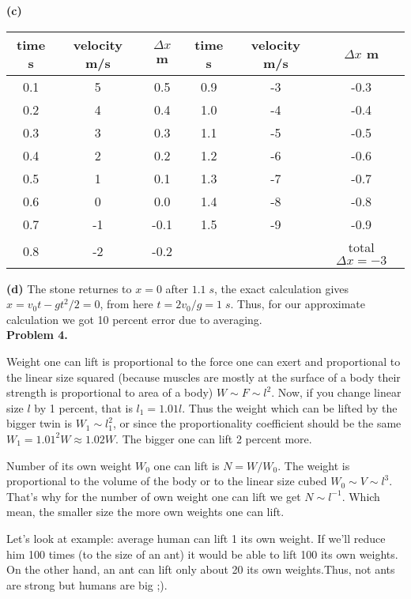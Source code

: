 \documentclass[12pt]{article}
\begin{document}
{\bf (c)}\\
\begin{tabular}{|c|c|c||c|c|c|}
\hline
time s & velocity  m/s & $\Delta x$ m &time s & velocity  m/s &$\Delta x$ m \\
\hline
0.1& 5&0.5&0.9& -3&-0.3\\
0.2& 4&0.4&1.0& -4&-0.4\\
0.3& 3&0.3&1.1& -5&-0.5\\
0.4& 2&0.2&1.2& -6&-0.6\\
0.5& 1&0.1&1.3& -7&-0.7\\
0.6& 0&0.0&1.4& -8&-0.8\\
0.7& -1&-0.1&1.5& -9&-0.9\\
0.8& -2&-0.2 &&&total $\Delta x=-3$\\
\hline
\end{tabular}

{\bf (d)} The stone returnes to $x=0$ after $1.1\;s$, the exact calculation gives
$x=v_0 t - g t^2/2=0$, from here $t=2 v_0/g =1\;s$. Thus, for our approximate 
calculation we got 10 percent error due to averaging. 
\\

{\bf Problem 4.}

Weight one can lift is proportional to the force one can exert and proportional to the linear size squared (because muscles are mostly at the surface of a body their strength is proportional to area of a body)  $W\sim F\sim l^2$.  Now, if you change linear size $l$ by 1 percent, that is
 $l_1=1.01 l$. Thus the weight which can be lifted by the bigger twin is $W_1\sim l_1^2$, or
 since the proportionality coefficient should be the same $W_1=1.01^2 W\approx 1.02 W$. The bigger one can lift 2 percent more. 
 
Number of its own weight $W_0$ one can lift is $N=W/W_0$. The weight is proportional to 
the volume of the body or to the linear size cubed $W_0\sim V\sim l^3$. That's why for
the number of own weight one can lift we get $N\sim l^{-1}$. Which mean, the smaller
size the more own weights one can lift.

Let's look at example: average human can lift 1 its own weight. If we'll reduce him 100 times
(to the size of an ant) it would be able to lift 100 its own weights. On the other hand, an ant
can lift only about 20 its own weights.Thus, not ants are strong but humans are big ;).

 
\end{document}
